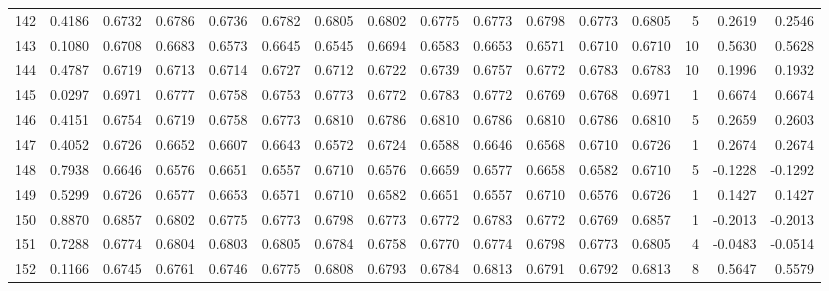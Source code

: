 \begin{tabular}{lrrrrrrrrrrrrrrr}
142 &      0.4186 &  0.6732 &  0.6786 &  0.6736 &  0.6782 &  0.6805 &  0.6802 &  0.6775 &  0.6773 &  0.6798 &   0.6773 &     0.6805 &      5 &                    0.2619 &                     0.2546 \\
143 &      0.1080 &  0.6708 &  0.6683 &  0.6573 &  0.6645 &  0.6545 &  0.6694 &  0.6583 &  0.6653 &  0.6571 &   0.6710 &     0.6710 &     10 &                    0.5630 &                     0.5628 \\
144 &      0.4787 &  0.6719 &  0.6713 &  0.6714 &  0.6727 &  0.6712 &  0.6722 &  0.6739 &  0.6757 &  0.6772 &   0.6783 &     0.6783 &     10 &                    0.1996 &                     0.1932 \\
145 &      0.0297 &  0.6971 &  0.6777 &  0.6758 &  0.6753 &  0.6773 &  0.6772 &  0.6783 &  0.6772 &  0.6769 &   0.6768 &     0.6971 &      1 &                    0.6674 &                     0.6674 \\
146 &      0.4151 &  0.6754 &  0.6719 &  0.6758 &  0.6773 &  0.6810 &  0.6786 &  0.6810 &  0.6786 &  0.6810 &   0.6786 &     0.6810 &      5 &                    0.2659 &                     0.2603 \\
147 &      0.4052 &  0.6726 &  0.6652 &  0.6607 &  0.6643 &  0.6572 &  0.6724 &  0.6588 &  0.6646 &  0.6568 &   0.6710 &     0.6726 &      1 &                    0.2674 &                     0.2674 \\
148 &      0.7938 &  0.6646 &  0.6576 &  0.6651 &  0.6557 &  0.6710 &  0.6576 &  0.6659 &  0.6577 &  0.6658 &   0.6582 &     0.6710 &      5 &                   -0.1228 &                    -0.1292 \\
149 &      0.5299 &  0.6726 &  0.6577 &  0.6653 &  0.6571 &  0.6710 &  0.6582 &  0.6651 &  0.6557 &  0.6710 &   0.6576 &     0.6726 &      1 &                    0.1427 &                     0.1427 \\
150 &      0.8870 &  0.6857 &  0.6802 &  0.6775 &  0.6773 &  0.6798 &  0.6773 &  0.6772 &  0.6783 &  0.6772 &   0.6769 &     0.6857 &      1 &                   -0.2013 &                    -0.2013 \\
151 &      0.7288 &  0.6774 &  0.6804 &  0.6803 &  0.6805 &  0.6784 &  0.6758 &  0.6770 &  0.6774 &  0.6798 &   0.6773 &     0.6805 &      4 &                   -0.0483 &                    -0.0514 \\
152 &      0.1166 &  0.6745 &  0.6761 &  0.6746 &  0.6775 &  0.6808 &  0.6793 &  0.6784 &  0.6813 &  0.6791 &   0.6792 &     0.6813 &      8 &                    0.5647 &                     0.5579 \\

\end{tabular}
